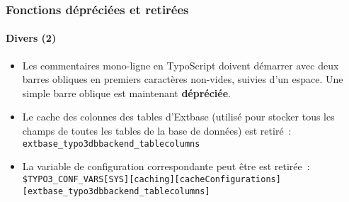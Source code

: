 
\begin{frame}[fragile]
	\frametitle{Fonctions dépréciées et retirées}
	\framesubtitle{Divers (2)}

	\begin{itemize}

		\item Les commentaires mono-ligne en TypoScript doivent démarrer avec deux barres obliques en premiers
			caractères non-vides, suivies d'un espace. Une simple barre oblique est maintenant \textbf{dépréciée}.

		\item Le cache des colonnes des tables d'Extbase (utilisé pour stocker tous les champs de toutes les tables
			de la base de données) est retiré~:\newline
			\texttt{extbase\_typo3dbbackend\_tablecolumns}

		\item La variable de configuration correspondante peut être est retirée~:
			\smaller
				\texttt{\$TYPO3\_CONF\_VARS[SYS][caching][cacheConfigurations]}\newline
				\tabto{0.4cm}\texttt{[extbase\_typo3dbbackend\_tablecolumns]}
			\normalsize

	\end{itemize}

\end{frame}

